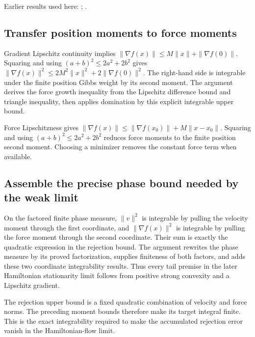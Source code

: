 \documentclass[11pt,a4paper]{report}
\begin{document}
Earlier results used here: \cite[Section~3.26.7]{LangevinLean2026ULASC}; \cite[Section~3.26.8]{LangevinLean2026ULASC}.
\subsection{\texorpdfstring{Transfer position moments to force moments}{Transfer position moments to force moments}}
\label{report-step-KineticLangevin-HamiltonianMoments-lean-4}


Gradient Lipschitz continuity implies \(\|\nabla f(x)\|\le M\|x\|+\|\nabla f(0)\|\). Squaring and using \((a+b)^2\le2a^2+2b^2\) gives \(\|\nabla f(x)\|^2\le2M^2\|x\|^2+2\|\nabla f(0)\|^2\). The right-hand side is integrable under the finite position Gibbs weight by its second moment. The argument derives the force growth inequality from the Lipschitz difference bound and triangle inequality, then applies domination by this explicit integrable upper bound.



Force Lipschitzness gives \(\|\nabla f(x)\|\le\|\nabla f(x_0)\|+M\|x-x_0\|\). Squaring and using \((a+b)^2\le2a^2+2b^2\) reduces force moments to the finite position second moment. Choosing a minimizer removes the constant force term when available.

\subsection{\texorpdfstring{Assemble the precise phase bound needed by the weak limit}{Assemble the precise phase bound needed by the weak limit}}
\label{report-step-KineticLangevin-HamiltonianMoments-lean-5}


On the factored finite phase measure, \(\|v\|^2\) is integrable by pulling the velocity moment through the first coordinate, and \(\|\nabla f(x)\|^2\) is integrable by pulling the force moment through the second coordinate. Their sum is exactly the quadratic expression in the rejection bound. The argument rewrites the phase measure by its proved factorization, supplies finiteness of both factors, and adds these two coordinate integrability results. Thus every tail premise in the later Hamiltonian stationarity limit follows from positive strong convexity and a Lipschitz gradient.



The rejection upper bound is a fixed quadratic combination of velocity and force norms. The preceding moment bounds therefore make its target integral finite. This is the exact integrability required to make the accumulated rejection error vanish in the Hamiltonian-flow limit.
\end{document}

